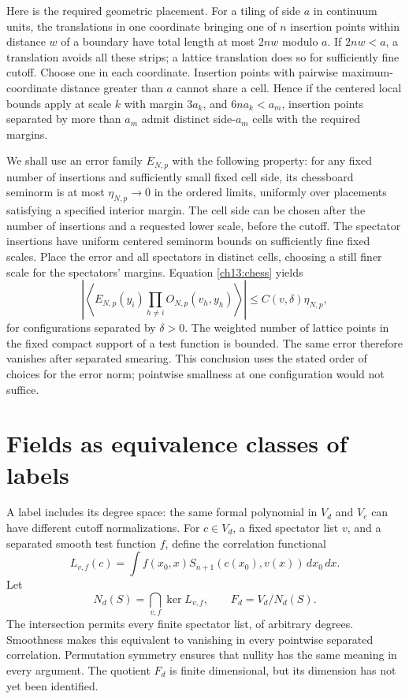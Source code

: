 Here is the required geometric placement. For a tiling of
side $a$ in continuum units, the translations in one coordinate bringing one of $n$
insertion points within distance $w$ of a boundary have total length at most
$2nw$ modulo $a$. If $2nw<a$, a translation avoids all these strips;
a lattice translation does so for sufficiently fine cutoff. Choose
one in each coordinate. Insertion points with pairwise maximum-coordinate
distance greater than $a$ cannot share a cell. Hence if the centered
local bounds apply at scale $k$ with margin $3a_k$, and
$6na_k<a_m$, insertion points separated by more than $a_m$ admit distinct
side-$a_m$ cells with the required margins.

We shall use an error family $E_{N,p}$ with the following property:
for any fixed number of insertions and sufficiently small fixed cell side, its
chessboard seminorm is at most $\eta_{N,p}\to0$ in the ordered
limits, uniformly over placements satisfying a specified interior
margin. The cell side can be chosen after the number of insertions and a requested
lower scale, before the cutoff. The spectator insertions have
uniform centered seminorm bounds on sufficiently fine fixed scales.
Place the error and all spectators in distinct cells, choosing a
still finer scale for the spectators' margins. Equation
\eqref{ch13:chess} yields
\begin{equation}
 \left|\left\langle E_{N,p}(y_i)
                  \prod_{h\ne i}O_{N,p}(v_h,y_h)\right\rangle\right|
               \le C(v,\delta)\eta_{N,p},
 \label{ch13:vanishing-error}
\end{equation}
for configurations separated by $\delta>0$. The weighted number of
lattice points in the fixed compact support of a test function is bounded. The same
error therefore vanishes after separated smearing. This conclusion
uses the stated order of choices for the error norm; pointwise
smallness at one configuration would not suffice.

\section{Fields as equivalence classes of labels}
\label{ch13:quotient}

A label includes its degree space: the same formal polynomial in
$V_d$ and $V_e$ can have different cutoff normalizations. For
$c\in V_d$, a fixed spectator list $v$, and a separated smooth test function
$f$, define the correlation functional
\[
 L_{v,f}(c)=\int f(x_0,x)S_{n+1}(c(x_0),v(x))\,dx_0\,dx.
\]
Let
\begin{equation}
 N_d(S)=\bigcap_{v,f}\ker L_{v,f},\qquad F_d=V_d/N_d(S).
 \label{ch13:null}
\end{equation}
The intersection permits every finite spectator list, of arbitrary
degrees. Smoothness makes this equivalent to vanishing in every
pointwise separated correlation. Permutation symmetry ensures that
nullity has the same meaning in every argument. The quotient $F_d$ is
finite dimensional, but its dimension has not yet been identified.

